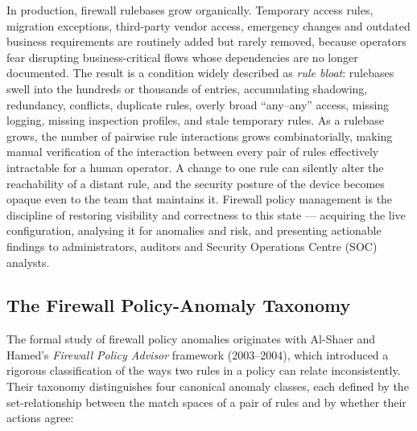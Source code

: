\documentclass[12pt,a4paper]{report}
\renewcommand{\_}{\textunderscore\allowbreak}
\begin{document}
In production, firewall rulebases grow organically. Temporary access rules, migration exceptions, third-party vendor access, emergency changes and outdated business requirements are routinely added but rarely removed, because operators fear disrupting business-critical flows whose dependencies are no longer documented. The result is a condition widely described as \emph{rule bloat}: rulebases swell into the hundreds or thousands of entries, accumulating shadowing, redundancy, conflicts, duplicate rules, overly broad ``any--any'' access, missing logging, missing inspection profiles, and stale temporary rules. As a rulebase grows, the number of pairwise rule interactions grows combinatorially, making manual verification of the interaction between every pair of rules effectively intractable for a human operator. A change to one rule can silently alter the reachability of a distant rule, and the security posture of the device becomes opaque even to the team that maintains it. Firewall policy management is the discipline of restoring visibility and correctness to this state --- acquiring the live configuration, analysing it for anomalies and risk, and presenting actionable findings to administrators, auditors and Security Operations Centre (SOC) analysts.

\subsection{The Firewall Policy-Anomaly Taxonomy}
\label{sec:ch2-taxonomy}
The formal study of firewall policy anomalies originates with Al-Shaer and Hamed's \emph{Firewall Policy Advisor} framework (2003--2004), which introduced a rigorous classification of the ways two rules in a policy can relate inconsistently. Their taxonomy distinguishes four canonical anomaly classes, each defined by the set-relationship between the match spaces of a pair of rules and by whether their actions agree:
\end{document}
